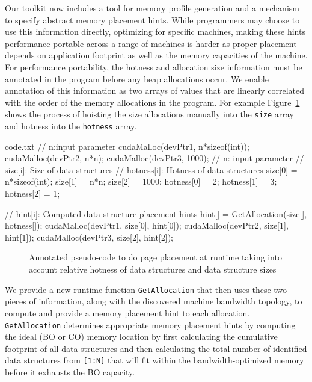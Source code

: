 Our toolkit now includes a tool for memory profile generation and a mechanism to specify
abstract memory placement hints. While programmers may choose to use this information
directly, optimizing for specific machines, making these hints performance portable across a range of machines
is harder as proper placement depends on application footprint as well as the memory
capacities of the machine. For performance portability,
the hotness and allocation size information must be annotated in the program before any heap allocations occur.
We enable annotation of this information as two arrays of values
that are linearly correlated with the order of the memory allocations in the program.
For example Figure~\ref{fig:code} shows the process of hoisting the size
allocations manually into the {\tt size} array and hotness into the {\tt hotness} array. 

\lstset { %
    language=C++,
    basicstyle=\footnotesize,%
    captionpos=b,
    frame=top,frame=bottom
}
\begin{filecontents*}{code.txt}
// n:input parameter
cudaMalloc(devPtr1, n*sizeof(int));
cudaMalloc(devPtr2, n*n);
cudaMalloc(devPtr3, 1000);
// n: input parameter
// size[i]: Size of data structures
// hotness[i]: Hotness of data structures
size[0] = n*sizeof(int);
size[1] = n*n;
size[2] = 1000;
hotness[0] = 2;
hotness[1] = 3;
hotness[2] = 1;

// hint[i]: Computed data structure placement hints
hint[] = GetAllocation(size[], hotness[]);
cudaMalloc(devPtr1, size[0], hint[0]);
cudaMalloc(devPtr2, size[1], hint[1]);
cudaMalloc(devPtr3, size[2], hint[2]);
\end{filecontents*}

\begin{figure}[t]
    \hfill
    \caption{Annotated pseudo-code to do page placement at runtime taking into account
relative hotness of data structures and data structure sizes}
    \label{fig:code}
\end{figure}

We provide a new runtime function {\tt GetAllocation} that then uses these two
pieces of information, along with the discovered machine bandwidth topology, to
compute and provide a memory placement hint to each allocation. {\tt
GetAllocation} determines appropriate memory placement hints by computing the
ideal (BO or CO) memory location by first calculating the cumulative footprint
of all data structures and then calculating the total number of identified data
structures from {\tt[1:N]} that will fit within the bandwidth-optimized memory
before it exhausts the BO capacity.

